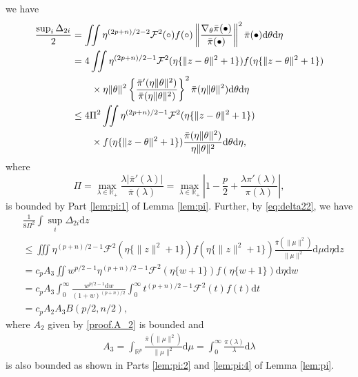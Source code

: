 \documentclass[preprint,11pt]{imsart}
\numberwithin{equation}{section}
\theoremstyle{plain}
\theoremstyle{definition}
\theoremstyle{remark}
\newcommand{\rd}{\mathrm{d}}
\begin{document}
we have
\begin{align}
\frac{ \sup_i\Delta_{2i}}{2}& =\iint   \eta^{(2p+n)/2-2} \mathcal{F}^2(\circ) f(\circ)
\left\|\frac{\nabla_\theta\bar{\pi}(\bullet)}{\bar{\pi}(\bullet)}\right\|^2 \bar{\pi}(\bullet) \rd \theta \rd \eta \notag\\
 &=4\iint   \eta^{(2p+n)/2-1} \mathcal{F}^2(\eta\{\|z-\theta\|^2+1\})
 f(\eta\{\|z-\theta\|^2+1\})\notag\\\
&\qquad\times \eta\|\theta\|^2\left\{\frac{\bar{\pi}'(\eta\|\theta\|^2)}{\bar{\pi}(\eta\|\theta\|^2)}\right\}^2
 \bar{\pi}(\eta\|\theta\|^2) \rd \theta   \rd \eta \notag\\
&\leq 4 \Pi^2
\iint  \eta^{(2p+n)/2-1} \mathcal{F}^2(\eta\{\|z-\theta\|^2+1\})
\notag\ \\
 &\qquad\times f(\eta\{\|z-\theta\|^2+1\})\frac{\bar{\pi}(\eta\|\theta\|^2)}{\eta\|\theta\|^2}
\rd \theta   \rd \eta , \label{eq:delta22}
\end{align}
where
\begin{equation}\label{eq:Pi}
 \Pi=\max_{\lambda\in\mathbb{R}_+} \frac{\lambda|\bar{\pi}'(\lambda)|}{\bar{\pi}(\lambda)}=
  \max_{\lambda\in\mathbb{R}_+}\left|1-\frac{p}{2}+\frac{\lambda\pi'(\lambda)}{\pi(\lambda)}\right|,
\end{equation}
is bounded by Part \ref{lem:pi:1} of Lemma \ref{lem:pi}.
Further, by \eqref{eq:delta22}, we have 
\begin{equation}\label{eq:last.sec:subsub1}
 \begin{split}
 &\frac{1 }{8\Pi^2}\int  \sup_i\Delta_{2i}\rd z \\
 &\leq
 \iiint   \eta^{(p+n)/2-1} \mathcal{F}^2(\eta\{\|z\|^2+1\})
 f(\eta\{\|z\|^2+1\}) 
\frac{\bar{\pi}(\|\mu\|^2)}{\|\mu\|^2} \rd \mu   \rd \eta  \rd z \\
 &=
 c_pA_3 \iint  w^{p/2-1} \eta^{(p+n)/2-1} \mathcal{F}^2(\eta\{w+1\})f(\eta\{w+1\})
   \rd \eta  \rd w \\
 &=
 c_pA_3 \int_0^\infty  \frac{w^{p/2-1} \rd w}{(1+w)^{(p+n)/2}}\int_0^\infty t^{(p+n)/2-1}\mathcal{F}^2(t)f(t) \rd t \\
 &= c_p A_2 A_3 B (p/2,n/2), 
\end{split}
\end{equation}
where $A_2$ given by \eqref{proof.A_2} is bounded and
\begin{align}
 A_3=\int_{\mathbb{R}^p} \frac{\bar{\pi}(\|\mu\|^2)}{\|\mu\|^2} \rd \mu
 =\int_0^\infty \frac{\pi(\lambda)}{\lambda} \rd \lambda\label{proof.A_3}
\end{align}
is also bounded as shown in Parts \ref{lem:pi:2} and \ref{lem:pi:4} of Lemma \ref{lem:pi}.
\end{document}
